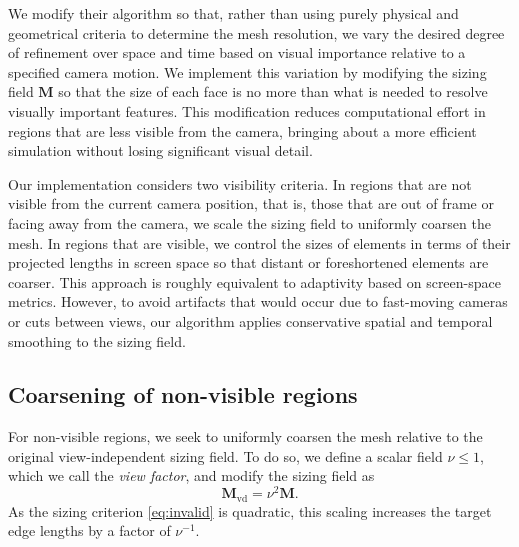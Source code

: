 \documentclass[10pt,journal,compsoc,twoside]{TexInputs/IEEEtran}
\begin{document}
We modify their algorithm so that, rather than using purely physical and geometrical criteria to determine the mesh resolution,
we vary the desired degree of refinement over space and time based on visual importance relative to a
specified camera motion.
We implement this variation by modifying the sizing field $\mathbf{M}$ so that
the size of each face is no more than what is needed to resolve visually
important features.
 This modification reduces computational effort in regions
that are less visible from the camera, bringing about a more efficient simulation without losing significant visual detail.


Our implementation considers two visibility criteria. In regions that are
not visible from the current camera position, that is, those that are out of
frame or facing away from the camera, we scale the sizing field to uniformly
coarsen the mesh. In regions that are visible, we control the sizes of elements
in terms of their projected lengths in screen space so that distant or foreshortened elements are coarser. This
approach is roughly equivalent to adaptivity based on screen-space metrics.
However, to avoid artifacts that would occur due to fast-moving cameras or cuts
between views, our algorithm applies conservative spatial and temporal
smoothing to the sizing field.


\subsection{Coarsening of non-visible regions}

For non-visible regions, we seek to uniformly coarsen the mesh relative to the original view-independent sizing field.
To do so, we define a scalar field $\nu \le 1$, which we call the \emph{view factor}, and modify the sizing field as
\begin{equation}
  \mathbf M_{\text{vd}} = \nu^2\mathbf M.
\end{equation}
As the sizing criterion \eqref{eq:invalid} is quadratic, this scaling
increases the target edge lengths by a factor of $\nu^{-1}$.
\end{document}
